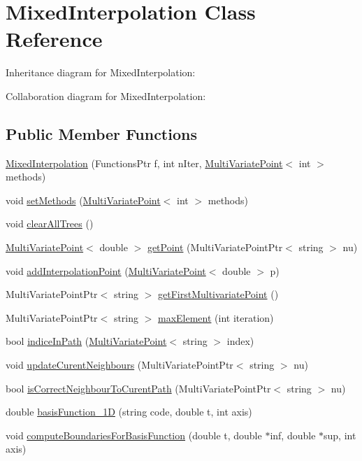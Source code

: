 \hypertarget{class_mixed_interpolation}{}\section{Mixed\+Interpolation Class Reference}
\label{class_mixed_interpolation}


Inheritance diagram for Mixed\+Interpolation\+:


Collaboration diagram for Mixed\+Interpolation\+:
\subsection*{Public Member Functions}
\begin{DoxyCompactItemize}
\item 
\hyperlink{class_mixed_interpolation_a5cf10a29fd266fe64811b2898b71af32}{Mixed\+Interpolation} (Functions\+Ptr f, int n\+Iter, \hyperlink{class_multi_variate_point}{Multi\+Variate\+Point}$<$ int $>$ methods)
\item 
void \hyperlink{class_mixed_interpolation_a269665fad93a49651d2d519d581efd49}{set\+Methods} (\hyperlink{class_multi_variate_point}{Multi\+Variate\+Point}$<$ int $>$ methods)
\item 
void \hyperlink{class_mixed_interpolation_a665be96aea549b82d877d1fc8eff1a9b}{clear\+All\+Trees} ()
\item 
\hyperlink{class_multi_variate_point}{Multi\+Variate\+Point}$<$ double $>$ \hyperlink{class_mixed_interpolation_a545bde4e4c83d9806fd08a6891b07af7}{get\+Point} (Multi\+Variate\+Point\+Ptr$<$ string $>$ nu)
\item 
void \hyperlink{class_mixed_interpolation_a51027c6018481bbfa4102901575e32ee}{add\+Interpolation\+Point} (\hyperlink{class_multi_variate_point}{Multi\+Variate\+Point}$<$ double $>$ p)
\item 
Multi\+Variate\+Point\+Ptr$<$ string $>$ \hyperlink{class_mixed_interpolation_a508361e1615e4fb3e77c702617637d6d}{get\+First\+Multivariate\+Point} ()
\item 
Multi\+Variate\+Point\+Ptr$<$ string $>$ \hyperlink{class_mixed_interpolation_a45908a6d89efe869a2b80d9f50264f7f}{max\+Element} (int iteration)
\item 
bool \hyperlink{class_mixed_interpolation_a5009f0fbe969538db58d5fa2f9997e4f}{indice\+In\+Path} (\hyperlink{class_multi_variate_point}{Multi\+Variate\+Point}$<$ string $>$ index)
\item 
void \hyperlink{class_mixed_interpolation_af5bbe4c2c6383989d3869f76ca6467c9}{update\+Curent\+Neighbours} (Multi\+Variate\+Point\+Ptr$<$ string $>$ nu)
\item 
bool \hyperlink{class_mixed_interpolation_af507dcd64c768b97c0ba2ff378a14f91}{is\+Correct\+Neighbour\+To\+Curent\+Path} (Multi\+Variate\+Point\+Ptr$<$ string $>$ nu)
\item 
double \hyperlink{class_mixed_interpolation_a97c5b558e53a5c98ed17d3fad6bb40ad}{basis\+Function\+\_\+1D} (string code, double t, int axis)
\item 
void \hyperlink{class_mixed_interpolation_a11a20252cbe44536f5be6024b348d755}{compute\+Boundaries\+For\+Basis\+Function} (double t, double $\ast$inf, double $\ast$sup, int axis)
\end{DoxyCompactItemize}
